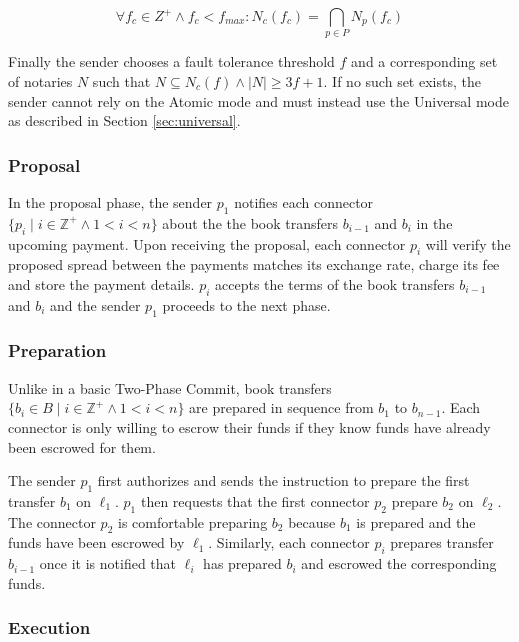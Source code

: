\documentclass[letterpaper,twocolumn,10pt]{article}
\begin{document}
\begin{equation}
\forall f_c \in Z^+ \land f_c < f_{max} : N_c(f_c) = \bigcap_{p \in P} N_p(f_c)
\end{equation}

Finally the sender chooses a fault tolerance threshold $f$ and a corresponding set of notaries $N$ such that $N \subseteq N_c(f) \land \left\vert{N}\right\vert \geq 3f+1$. If no such set exists, the sender cannot rely on the Atomic mode and must instead use the Universal mode as described in Section \ref{sec:universal}.


\subsubsection{Proposal}

In the proposal phase, the sender $p_1$ notifies each connector $ \{ p_i \mid i \in \mathbb{Z}^+ \land 1 < i < n \} $ about the the book transfers $b_{i-1}$ and $b_i$ in the upcoming payment. Upon receiving the proposal, each connector $p_i$ will verify the proposed spread between the payments matches its exchange rate, charge its fee and store the payment details. $p_i$ accepts the terms of the book transfers $b_{i-1}$ and $b_i$ and the sender $p_1$ proceeds to the next phase.


\subsubsection{Preparation}

Unlike in a basic Two-Phase Commit, book transfers
$ \{ b_i \in B \mid i \in \mathbb{Z}^+ \land 1 < i < n \} $
are prepared in sequence from $b_1$ to $b_{n-1}$. Each connector is only willing to escrow their funds if they know funds have already been escrowed for them.

The sender $p_1$ first authorizes and sends the instruction to prepare the first transfer $b_1$ on $\ell_1$. $p_1$ then requests that the first connector $p_2$ prepare $b_2$ on $\ell_2$. The connector $p_2$ is comfortable preparing $b_2$ because $b_1$ is prepared and the funds have been escrowed by $\ell_1$. Similarly, each connector $p_i$ prepares transfer $b_{i-1}$ once it is notified that $\ell_i$ has prepared $b_i$ and escrowed the corresponding funds.


\subsubsection{Execution}
\end{document}
